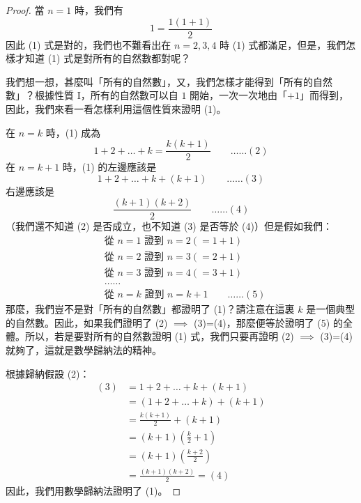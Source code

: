 \begin{proof}
當 $n=1$ 時，我們有
\begin{equation*}
  1 = \frac{1(1+1)}{2}
\end{equation*}
因此 (1) 式是對的，我們也不難看出在 $n=2, 3, 4$ 時 (1) 式都滿足，但是，我們怎樣才知道 (1) 式是對所有的自然數都對呢？

我們想一想，甚麼叫「所有的自然數」，又，我們怎樣才能得到「所有的自然數」？根據性質 I，所有的自然數可以自 $1$ 開始，一次一次地由「$+1$」而得到，因此，我們來看一看怎樣利用這個性質來證明 (1)。

在 $n=k$ 時，(1) 成為
\begin{equation}\label{eq:ind_hyp}
  1+2+\dots+k = \frac{k(k+1)}{2} \qquad \dots\dots (2)
\end{equation}
在 $n=k+1$ 時，(1) 的左邊應該是
\begin{equation}\label{eq:ind_lhs}
  1+2+\dots+k+(k+1) \qquad \dots\dots (3)
\end{equation}
右邊應該是
\begin{equation}\label{eq:ind_rhs}
  \frac{(k+1)(k+2)}{2} \qquad \dots\dots (4)
\end{equation}
（我們還不知道 (2) 是否成立，也不知道 (3) 是否等於 (4)）但是假如我們：
\begin{align*}
  &\text{從 } n=1 \text{ 證到 } n=2 (=1+1) \\
  &\text{從 } n=2 \text{ 證到 } n=3 (=2+1) \\
  &\text{從 } n=3 \text{ 證到 } n=4 (=3+1) \\
  &\dots\dots \\
  &\text{從 } n=k \text{ 證到 } n=k+1 \qquad \dots\dots (5)
\end{align*}
那麼，我們豈不是對「所有的自然數」都證明了 (1)？請注意在這裏 $k$ 是一個典型的自然數。因此，如果我們證明了 (2) $\implies$ (3)=(4)，那麼便等於證明了 (5) 的全體。所以，若是要對所有的自然數證明 (1) 式，我們只要再證明 (2) $\implies$ (3)=(4) 就夠了，這就是數學歸納法的精神。

根據歸納假設 (2)：
\begin{align*}
  (3) &= 1 + 2 + \dots + k + (k+1) \\
  &= (1 + 2 + \dots + k) + (k+1) \\
  &= \frac{k(k+1)}{2} + (k+1) \\
  &= (k+1)\left(\frac{k}{2} + 1\right) \\
  &= (k+1)\left(\frac{k+2}{2}\right) \\
  &= \frac{(k+1)(k+2)}{2} = (4)
\end{align*}
因此，我們用數學歸納法證明了 (1)。
\end{proof}

